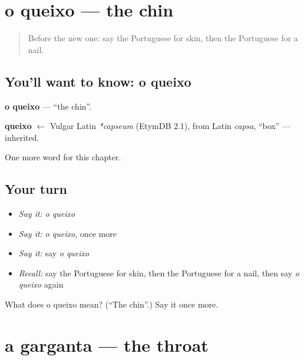 \section[o queixo]{o queixo — the chin}

\label{lesson:PT-C33-queixo}



\begin{quote}
Before the new one: say the Portuguese for skin, then the Portuguese for a nail.
\end{quote}

\subsection*{You'll want to know: o queixo}
\textbf{o queixo} — \textquotedblleft{}the chin\textquotedblright{}.

\begin{cousinweb}
\textbf{queixo} $\leftarrow$ Vulgar Latin \emph{*capseum} (EtymDB 2.1), from Latin \emph{capsa}, \textquotedblleft{}box\textquotedblright{} — inherited.
\end{cousinweb}

\begin{grammarlens}[title={What you've built}]
One more word for this chapter.
\end{grammarlens}

\subsection*{Your turn}
\begin{itemize}
\raggedright
  \item \emph{Say it:} \emph{o queixo}
  \item \emph{Say it:} \emph{o queixo}, once more
  \item \emph{Say it:} say \emph{o queixo}
  \item \emph{Recall:} say the Portuguese for skin, then the Portuguese for a nail, then say \emph{o queixo} again
\end{itemize}

\begin{tcolorbox}[breakable,colback=teal!4,colframe=teal!35!black,title={Before you move on}]
What does o queixo mean? (\textquotedblleft{}The chin\textquotedblright{}.) Say it once more.
\end{tcolorbox}
\section[a garganta]{a garganta — the throat}

